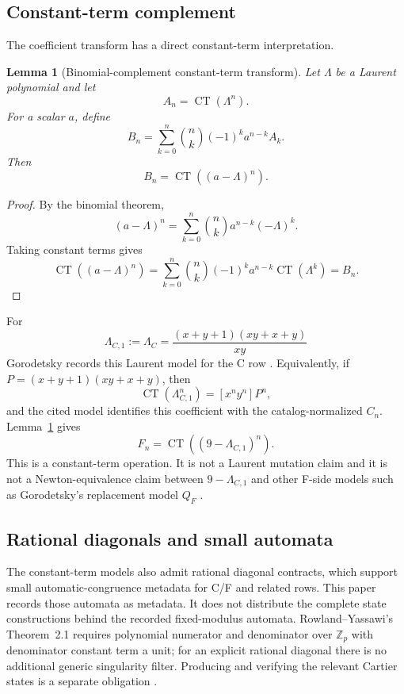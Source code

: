 \documentclass[11pt,a4paper]{article}
\newtheorem{lemma}[theorem]{Lemma}
\DeclareMathOperator{\CT}{CT}
\begin{document}
\subsection{Constant-term complement}

The coefficient transform has a direct constant-term interpretation.

\begin{lemma}[Binomial-complement constant-term transform]
\label{lem:ct-complement}
Let $\Lambda$ be a Laurent polynomial and let
\[
  A_n=\CT(\Lambda^n).
\]
For a scalar $a$, define
\[
  B_n=\sum_{k=0}^n\binom{n}{k}(-1)^ka^{n-k}A_k.
\]
Then
\[
  B_n=\CT((a-\Lambda)^n).
\]
\end{lemma}

\begin{proof}
By the binomial theorem,
\[
  (a-\Lambda)^n=\sum_{k=0}^n\binom{n}{k}a^{n-k}(-\Lambda)^k.
\]
Taking constant terms gives
\[
  \CT((a-\Lambda)^n)
  =\sum_{k=0}^n\binom{n}{k}(-1)^ka^{n-k}\CT(\Lambda^k)=B_n.
\]
\end{proof}

For
\[
  \Lambda_{C,1}:=\Lambda_C=\frac{(x+y+1)(xy+x+y)}{xy}
\]
Gorodetsky records this Laurent model for the C row
\cite{gorodetsky_2023_sporadic_representations}.  Equivalently, if
$P=(x+y+1)(xy+x+y)$, then
\[
  \CT(\Lambda_{C,1}^n)=[x^ny^n]P^n,
\]
and the cited model identifies this coefficient with the catalog-normalized
$C_n$.  Lemma~\ref{lem:ct-complement} gives
\[
  F_n=\CT((9-\Lambda_{C,1})^n).
\]
This is a constant-term operation.  It is not a Laurent mutation claim and it
is not a Newton-equivalence claim between $9-\Lambda_{C,1}$ and other F-side
models such as Gorodetsky's replacement model $Q_F$
\cite{gorodetsky_2023_sporadic_representations}.

\subsection{Rational diagonals and small automata}

The constant-term models also admit rational diagonal contracts, which support
small automatic-congruence metadata for C/F and related rows.  This paper
records those automata as metadata.  It does not distribute the complete state constructions behind the recorded
fixed-modulus automata.  Rowland--Yassawi's Theorem~2.1 requires polynomial
numerator and denominator over $\mathbb Z_p$ with denominator constant term
a unit; for an explicit rational diagonal there is no additional generic
singularity filter.  Producing and verifying the relevant Cartier states is
a separate obligation \cite{rowland_yassawi_2015_automatic_congruences}.
\end{document}
